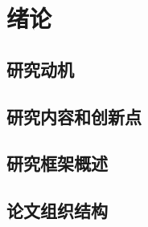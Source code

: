 \chapter{绪论}
\label{chap:intro}

\section{研究动机}

\section{研究内容和创新点}

\section{研究框架概述}

\section{论文组织结构}










